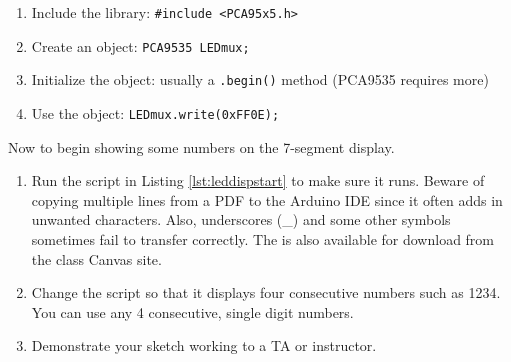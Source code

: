 \begin{enumerate}
    \item Include the library: \lstinline|#include <PCA95x5.h>|
    \item Create an object: \lstinline|PCA9535 LEDmux;|
    \item Initialize the object: usually a \lstinline|.begin()| method (PCA9535 requires more)
    \item Use the object: \lstinline|LEDmux.write(0xFF0E);|
\end{enumerate}

Now to begin showing some numbers on the 7-segment display.

\begin{enumerate}
    \item Run the script in Listing \ref{lst:leddispstart} to make sure it runs. Beware of copying
            multiple lines from a PDF to the Arduino IDE since it often adds in unwanted characters. 
            Also, underscores (\_) and some other symbols sometimes fail to transfer correctly. The 
            is also available for download from the class Canvas site.
    \item Change the script so that it displays four consecutive numbers such as 1234. You can use
            any 4 consecutive, single digit numbers.
    \item Demonstrate your sketch working to a TA or instructor.
\end{enumerate}

